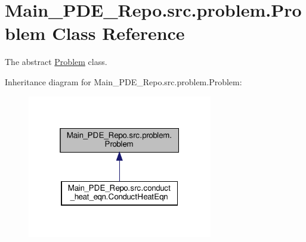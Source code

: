 \hypertarget{classMain__PDE__Repo_1_1src_1_1problem_1_1Problem}{}\section{Main\+\_\+\+P\+D\+E\+\_\+\+Repo.\+src.\+problem.\+Problem Class Reference}
\label{classMain__PDE__Repo_1_1src_1_1problem_1_1Problem}


The abstract \hyperlink{classMain__PDE__Repo_1_1src_1_1problem_1_1Problem}{Problem} class.  




Inheritance diagram for Main\+\_\+\+P\+D\+E\+\_\+\+Repo.\+src.\+problem.\+Problem\+:
\nopagebreak
\begin{figure}[H]
\begin{center}
\leavevmode
\includegraphics[width=229pt]{classMain__PDE__Repo_1_1src_1_1problem_1_1Problem__inherit__graph}
\end{center}
\end{figure}
